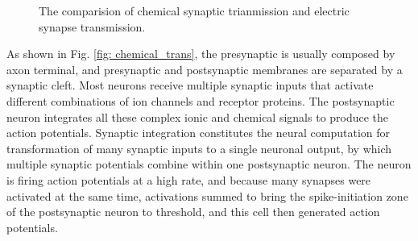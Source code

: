 \documentclass[journal,comsoc]{IEEEtran}
\begin{document}
\begin{figure}[htbp]
					\caption{The comparision of chemical synaptic trianmission and electric synapse transmission.}
					\label{fig: synaptic_cop}
				\end{figure}
			
				As shown in Fig. \ref{fig: chemical_trans}, the presynaptic is usually composed by axon terminal, and presynaptic and postsynaptic membranes are separated by a synaptic cleft.
				Most neurons receive multiple synaptic inputs that activate different combinations of ion channels and receptor proteins. 
				The postsynaptic neuron integrates all these complex ionic and chemical signals to produce the action potentials\cite{beanewman2003structure007neuroscience}. 
				Synaptic integration constitutes the neural computation for transformation of many synaptic inputs to a single neuronal output, by which multiple synaptic potentials combine within one postsynaptic neuron.
				The neuron is firing action potentials at a high rate, and because many synapses were activated at the same time, activations summed to bring the spike-initiation zone of the postsynaptic neuron to threshold, and this cell then generated action potentials. 
				
\end{document}

